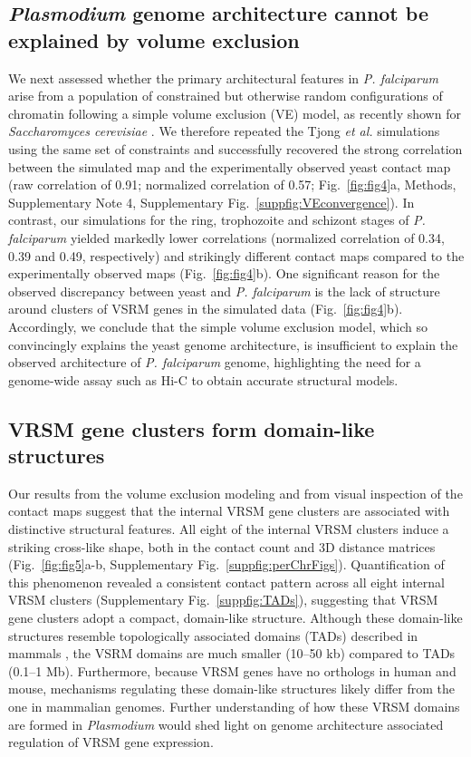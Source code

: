 \subsection*{{\em Plasmodium} genome architecture cannot be explained by volume exclusion}
We next assessed whether the primary architectural features in {\em P. falciparum} arise from a population of constrained but otherwise random configurations of chromatin following a simple volume exclusion (VE) model, as recently shown for {\em Saccharomyces cerevisiae} \citep{tjong:physical}. We therefore repeated the Tjong {\em et al.} simulations using the same set of constraints and successfully recovered the strong correlation between the simulated map and the experimentally observed yeast contact map (raw correlation of 0.91; normalized correlation of 0.57; Fig.~\ref{fig:fig4}a, Methods, Supplementary Note 4, Supplementary Fig.~\ref*{suppfig:VEconvergence}). In contrast, our simulations for the ring, trophozoite and schizont stages of {\em P. falciparum} yielded markedly lower correlations (normalized correlation of 0.34, 0.39 and 0.49, respectively) and strikingly different contact maps compared to the experimentally observed maps (Fig.~\ref{fig:fig4}b). One significant reason for the observed discrepancy between yeast and {\em P. falciparum} is the lack of structure around clusters of VSRM genes in the simulated data (Fig.~\ref{fig:fig4}b). Accordingly, we conclude that the simple volume exclusion model, which so convincingly explains the yeast genome architecture, is insufficient to explain the observed architecture of {\em P. falciparum} genome, highlighting the need for a genome-wide assay such as Hi-C to obtain accurate structural models.

\subsection*{VRSM gene clusters form domain-like structures}
Our results from the volume exclusion modeling and from visual inspection of the contact maps suggest that the internal VRSM gene clusters are associated with distinctive structural features. All eight of the internal VRSM clusters induce a striking cross-like shape, both in the contact count and 3D distance matrices (Fig.~\ref{fig:fig5}a-b, Supplementary Fig.~\ref*{suppfig:perChrFigs}). Quantification of this phenomenon revealed a consistent contact pattern across all eight internal VRSM clusters (Supplementary Fig.~\ref*{suppfig:TADs}), suggesting that VRSM gene clusters adopt a compact, domain-like structure. Although these domain-like structures resemble topologically associated domains (TADs) described in mammals \citep{dixon:topological, nora:spatial}, the VSRM domains are much smaller (10--50 kb) compared to TADs (0.1--1 Mb). Furthermore, because VRSM genes have no orthologs in human and mouse, mechanisms regulating these domain-like structures likely differ from the one in mammalian genomes. Further understanding of how these VRSM domains are formed in  \emph{Plasmodium} would shed light on genome architecture associated regulation of VRSM gene expression.

